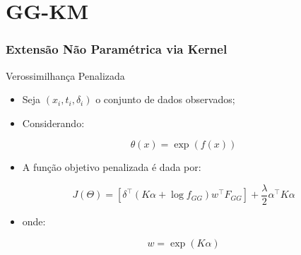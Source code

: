 \documentclass[aspectratio=169,t,xcolor=table]{beamer}
\begin{document}





\section{GG-KM}

\begin{frame}
\frametitle{Extensão Não Paramétrica via Kernel}
\end{frame}


\begin{frame}{Verossimilhança Penalizada}

\begin{itemize}
\item Seja $(x_i,t_i,\delta_i)$ o conjunto de dados observados;

\vspace{0.3cm}

\item Considerando:

\end{itemize}

$$
\theta(x)=\exp(f(x))
$$

\vspace{0.3cm}

\begin{itemize}
\item A função objetivo penalizada é dada por:
\end{itemize}

$$
J(\Theta)=
\left[
\delta^\top (K\alpha+\log f_{GG})
w^\top F_{GG}
\right]
+
\frac{\lambda}{2}\alpha^\top K\alpha
$$

\vspace{0.3cm}

\begin{itemize}
\item onde:
\end{itemize}

$$
w=\exp(K\alpha)
$$

\end{frame}
\end{document}
